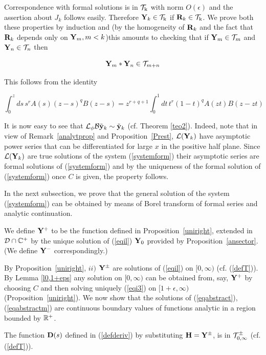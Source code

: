 \documentclass[12pt]{article}
\begin{document}
\begin{subsection}{Correspondence with formal solutions}
\z is in $\cal T_{\rm k}$ with norm  $O(\epsilon)$ and the assertion
about
$J_k$ follows easily. Therefore ${\bf Y}_k\in\cal T_{\rm k}$ 
if ${\bf R}_k\in\cal T_{\rm k}$. We prove both these properties by induction
and (by the  homogeneity of ${\bf R}_k$ and the fact that
${\bf R}_k$ depends only on ${\bf Y}_m,m<k$)this  amounts 
 to checking that
if ${\bf Y}_m\in {\cal T}_m$ and ${\bf Y}_n\in {\cal T}_n$
then

$${\bf Y}_m*{\bf Y}_n\in{\cal T}_{m+n}$$

This follows from the identity 


$$\int_0^z ds\, s^rA(s)(z-s)^qB(z-s)=z^{r+q+1}\int_0^1 dt\,t^r(1-t)^q A(zt)B(z-zt)$$

 

\Box



 
It is
now easy to see that ${\cal L}_\phi{\cal B}\tilde{{\bf y}}_k\sim\tilde{{\bf y}}_k$
(cf. Theorem \ref{teo2}). Indeed, note that in view of
Remark~\ref{analytprop} and Proposition~\ref{Prest},  ${\cal L}({\bf Y}_k)$
have asymptotic power series that can be differentiated
for large $x$ in the positive half plane. Since
${\cal L}({\bf Y}_k)$ are true solutions of the system (\ref{systemform})
their asymptotic series are formal solutions of 
(\ref{systemform}) and by  the uniqueness of the formal
solution of (\ref{systemform}) once $C$ is given, the property
follows.


In the next subsection, we prove  that the general solution of the system 
(\ref{systemform}) can be obtained by means
of Borel transform of formal series and analytic continuation.


We define ${\bf Y}^+$ to be the
function
defined in Proposition~\ref{uniright},
extended in ${\cal D}\cap\mathbb{C}^+$
 by the unique solution
of (\ref{eqil})  ${\bf Y}_0$ provided by Proposition~\ref{ansector}.
(We define ${\bf Y}^-$ correspondingly.)


By Proposition~\ref{uniright}, $ii)$ ${\bf Y}^\pm$ are solutions
of (\ref{eqil}) on $[0,\infty)$
(cf. (\ref{defT})). By Lemma \ref{l0,1+eps} any solution
on $[0,\infty)$
can be obtained from, say, ${\bf Y}^+$ by choosing $C$
and then solving uniquely (\ref{eqi3}) on $[1+\epsilon,\infty)$
(Proposition~\ref{uniright}). We now show that
the solutions of (\ref{eqabstract}), (\ref{eqabstractm})
are continuous boundary values  of functions
analytic in a region bounded by $\mathbb{R}^+$.

 The function $\mathbf{D}(s)$
defined in (\ref{defderiv}) by substituting ${\bf H}={\bf Y}^{\pm}$, is in
${\cal T}^{\pm}_{0,\infty}$ (cf. (\ref{defT})).


\end{subsection}
\end{document}
